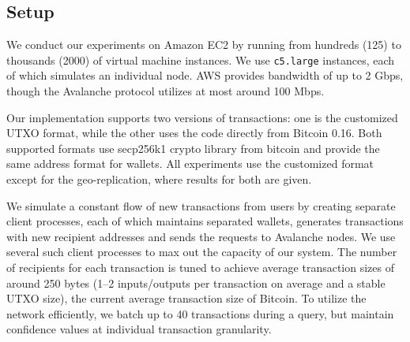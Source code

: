 \newcommand{\sysname}{Avalanche}


\subsection{Setup}%
We conduct our experiments on Amazon EC2 by running from hundreds (125) to thousands (2000)
of virtual machine instances.  We use \texttt{c5.large} instances, each of
which simulates an individual node. AWS provides
bandwidth of up to 2 Gbps, though the {\sysname} protocol utilizes at most around 100 Mbps.

Our implementation supports two versions of transactions: one is the customized UTXO format,
while the other uses the code directly from Bitcoin 0.16. Both supported formats use secp256k1
crypto library from bitcoin and provide the same address format for wallets. All experiments
use the customized format except for the geo-replication, where results for both are given.

We simulate a constant flow of new transactions from users by creating
separate client processes, each of which maintains
separated wallets, generates transactions with new recipient addresses and
sends the requests to {\sysname} nodes.
We use several such client
processes to max out the capacity of our system.  The number of recipients
for each transaction is tuned to achieve average transaction sizes of
around 250 bytes (1--2 inputs/outputs per transaction on average and a stable
UTXO size), the current average transaction size of Bitcoin. To utilize the
network efficiently, we batch up to 40 transactions during a query, but
maintain confidence values at individual transaction granularity.

